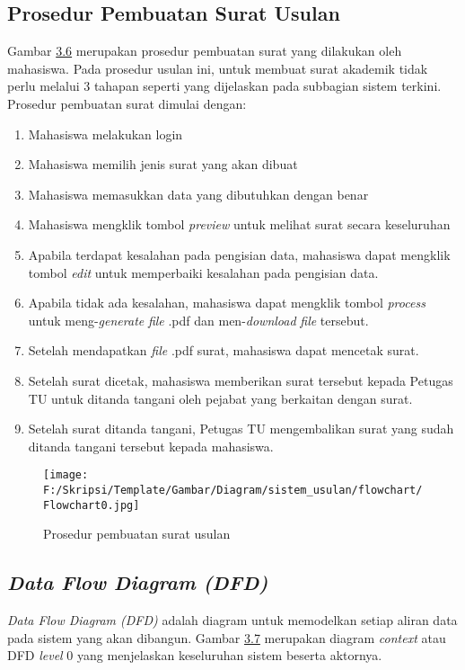 \subsection{Prosedur Pembuatan Surat Usulan}
\label{sec:pembuatan_surat_usulan}
Gambar \hyperlink{pembuatan_usulan}{3.6} merupakan prosedur pembuatan surat yang dilakukan oleh mahasiswa. Pada prosedur usulan ini, untuk membuat surat akademik tidak perlu melalui 3 tahapan seperti yang dijelaskan pada subbagian sistem terkini. Prosedur pembuatan surat dimulai dengan:
\begin{enumerate}
	\item Mahasiswa melakukan login
	\item Mahasiswa memilih jenis surat yang akan dibuat
	\item Mahasiswa memasukkan data yang dibutuhkan dengan benar
	\item Mahasiswa mengklik tombol \textit{preview} untuk melihat surat secara keseluruhan
	\item Apabila terdapat kesalahan pada pengisian data, mahasiswa dapat mengklik tombol \textit{edit} untuk memperbaiki kesalahan pada pengisian data.
	\item Apabila tidak ada kesalahan, mahasiswa dapat mengklik tombol \textit{process} untuk meng-\textit{generate} \textit{file} .pdf dan men-\textit{download} \textit{file} tersebut.
	\item Setelah mendapatkan \textit{file} .pdf surat, mahasiswa dapat mencetak surat.
	\item Setelah surat dicetak, mahasiswa memberikan surat tersebut kepada Petugas TU untuk ditanda tangani oleh pejabat yang berkaitan dengan surat.
	\item Setelah surat ditanda tangani, Petugas TU mengembalikan surat yang sudah ditanda tangani tersebut kepada mahasiswa.
	\
\end{enumerate}
\begin{figure}[H]
	\centering
		\texttt{[image: F:/Skripsi/Template/Gambar/Diagram/sistem\_usulan/flowchart/Flowchart0.jpg]}
	{\caption{Prosedur pembuatan surat usulan}}
	\label{fig:pembuatan_usulan}
\end{figure}

\subsection{\textit{Data Flow Diagram (DFD)}}
\label{sec:data_flow_diagram}
\textit{Data Flow Diagram (DFD)} adalah diagram untuk memodelkan setiap aliran data pada sistem yang akan dibangun.
Gambar \hyperlink{data_flow}{3.7} merupakan diagram \textit{context} atau DFD \textit{level} 0 yang menjelaskan 
keseluruhan sistem beserta aktornya.

